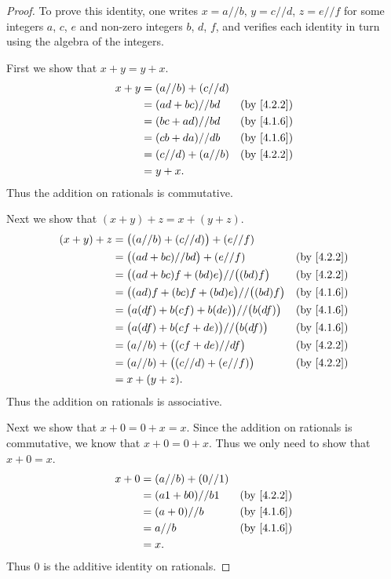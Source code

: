 \begin{proof}
  To prove this identity, one writes \(x = a // b\), \(y = c // d\), \(z = e // f\) for some integers \(a\), \(c\), \(e\) and non-zero integers \(b\), \(d\), \(f\), and verifies each identity in turn using the algebra of the integers.

  First we show that \(x + y = y + x\).
  \begin{align*}
    x + y & = (a // b) + (c // d)                            \\
          & = (ad + bc) // bd     & \text{(by \cref{4.2.2})} \\
          & = (bc + ad) // bd     & \text{(by \cref{4.1.6})} \\
          & = (cb + da) // db     & \text{(by \cref{4.1.6})} \\
          & = (c // d) + (a // b) & \text{(by \cref{4.2.2})} \\
          & = y + x.
  \end{align*}
  Thus the addition on rationals is commutative.

  Next we show that \((x + y) + z = x + (y + z)\).
  \begin{align*}
    (x + y) + z & = \big((a // b) + (c // d)\big) + (e // f)                                      \\
                & = \big((ad + bc) // bd\big) + (e // f)               & \text{(by \cref{4.2.2})} \\
                & = \big((ad + bc)f + (bd)e\big) // \big((bd)f\big)    & \text{(by \cref{4.2.2})} \\
                & = \big((ad)f + (bc)f + (bd)e\big) // \big((bd)f\big) & \text{(by \cref{4.1.6})} \\
                & = \big(a(df) + b(cf) + b(de)\big) // \big(b(df)\big) & \text{(by \cref{4.1.6})} \\
                & = \big(a(df) + b(cf + de)\big) // \big(b(df)\big)    & \text{(by \cref{4.1.6})} \\
                & = (a // b) + \big((cf + de) // df\big)               & \text{(by \cref{4.2.2})} \\
                & = (a // b) + \big((c // d) + (e // f)\big)           & \text{(by \cref{4.2.2})} \\
                & = x + (y + z).
  \end{align*}
  Thus the addition on rationals is associative.

  Next we show that \(x + 0 = 0 + x = x\).
  Since the addition on rationals is commutative, we know that \(x + 0 = 0 + x\).
  Thus we only need to show that \(x + 0 = x\).
  \begin{align*}
    x + 0 & = (a // b) + (0 // 1)                            \\
          & = (a1 + b0) // b1     & \text{(by \cref{4.2.2})} \\
          & = (a + 0) // b        & \text{(by \cref{4.1.6})} \\
          & = a // b              & \text{(by \cref{4.1.6})} \\
          & = x.
  \end{align*}
  Thus \(0\) is the additive identity on rationals.


\end{proof}
